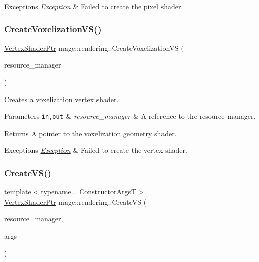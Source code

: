 \begin{DoxyExceptions}{Exceptions}
{\em \mbox{\hyperlink{classmage_1_1_exception}{Exception}}} & Failed to create the pixel shader. \\
\hline
\end{DoxyExceptions}
\mbox{\label{namespacemage_1_1rendering_a00366c24902efdf909d9238ff8203fdb}} 
\subsubsection{\texorpdfstring{Create\+Voxelization\+V\+S()}{CreateVoxelizationVS()}}
{\footnotesize\ttfamily \mbox{\hyperlink{namespacemage_1_1rendering_aaf704b9c54a4181f4950a1761de69dda}{Vertex\+Shader\+Ptr}} mage\+::rendering\+::\+Create\+Voxelization\+VS (\begin{DoxyParamCaption}\item[{\mbox{\hyperlink{classmage_1_1rendering_1_1_resource_manager}{Resource\+Manager}} \&}]{resource\+\_\+manager }\end{DoxyParamCaption})}

Creates a voxelization vertex shader.


\begin{DoxyParams}[1]{Parameters}
\mbox{\tt in,out}  & {\em resource\+\_\+manager} & A reference to the resource manager. \\
\hline
\end{DoxyParams}
\begin{DoxyReturn}{Returns}
A pointer to the voxelization geometry shader. 
\end{DoxyReturn}

\begin{DoxyExceptions}{Exceptions}
{\em \mbox{\hyperlink{classmage_1_1_exception}{Exception}}} & Failed to create the vertex shader. \\
\hline
\end{DoxyExceptions}
\mbox{\label{namespacemage_1_1rendering_a0560d70d2fe6382213ca07b993d8b028}} 
\subsubsection{\texorpdfstring{Create\+V\+S()}{CreateVS()}}
{\footnotesize\ttfamily template$<$typename... Constructor\+ArgsT$>$ \\
\mbox{\hyperlink{namespacemage_1_1rendering_aaf704b9c54a4181f4950a1761de69dda}{Vertex\+Shader\+Ptr}} mage\+::rendering\+::\+Create\+VS (\begin{DoxyParamCaption}\item[{\mbox{\hyperlink{classmage_1_1rendering_1_1_resource_manager}{Resource\+Manager}} \&}]{resource\+\_\+manager,  }\item[{Constructor\+ArgsT \&\&...}]{args }\end{DoxyParamCaption})}

